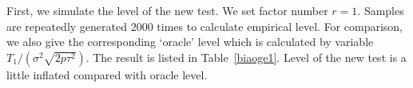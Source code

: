 \documentclass[review]{elsarticle}
\theoremstyle{plain}
\theoremstyle{definition}
\theoremstyle{remark}
\begin{document}

First, we simulate the level of the new test. We set factor number $r=1$.
Samples are repeatedly generated $2000$ times to calculate empirical level.
For comparison, we also give the corresponding `oracle' level which is calculated by variable ${T_1}/(\sigma^2\sqrt{2p\tau^2})$.
The result is listed in
Table~\ref{biaoge1}.
Level of the new test is a little inflated compared with oracle level.
\end{document}
